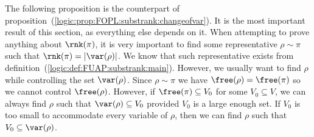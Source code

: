 The following proposition is the counterpart of
proposition~(\ref{logic:prop:FOPL:substrank:changeofvar}). It is the
most important result of this section, as everything else depends on
it. When attempting to prove anything about $\rnk(\pi)$, it is very
important to find some representative $\rho\sim\pi$ such that
$\rnk(\pi)=|\var(\rho)|$. We know that such representative exists
from definition~(\ref{logic:def:FUAP:substrank:main}). However, we
usually want to find $\rho$ while controlling the set $\var(\rho)$.
Since $\rho\sim\pi$ we have $\free(\rho)=\free(\pi)$ so we cannot
control $\free(\rho)$. However, if $\free(\pi)\subseteq V_{0}$ for
some $V_{0}\subseteq V$, we can always find $\rho$ such that
$\var(\rho)\subseteq V_{0}$ provided $V_{0}$ is a large enough set.
If $V_{0}$ is too small to accommodate every variable of $\rho$,
then we can find $\rho$ such that $V_{0}\subseteq\var(\rho)$.

